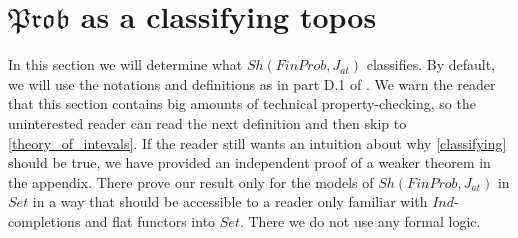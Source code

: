 \documentclass[a4paper]{amsproc}
\theoremstyle{plain}
\theoremstyle{definition}
\theoremstyle{remark}
\numberwithin{equation}{section}
\begin{document}
\section{$\mathfrak{Prob}$ as a classifying topos}

In this section we will determine what $Sh(FinProb, J_{at})$ classifies. By default, we will use the notations and definitions as in part D.1 of \cite{elephant}. We warn the reader that this section contains big amounts of technical property-checking, so the uninterested reader can read the next definition and then skip to \ref{theory_of_intevals}. If the reader still wants an intuition about why \ref{classifying} should be true, we have provided an independent proof of a weaker theorem in the appendix. There prove our result only for the models of $Sh(FinProb, J_{at})$ in $Set$ in a way that should be accessible to a reader only familiar with $Ind$-completions and flat functors into $Set$. There we do not use any formal logic.
\end{document}
